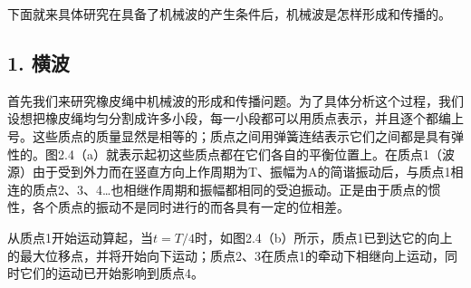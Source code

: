 下面就来具体研究在具备了机械波的产生条件后，机械波是怎样形成和传播的。

\subsection{1. 横波}\label{ux6a2aux6ce2}

首先我们来研究橡皮绳中机械波的形成和传播问题。为了具体分析这个过程，我们设想把橡皮绳均匀分割成许多小段，每一小段都可以用质点表示，并且逐个都编上号。这些质点的质量显然是相等的；质点之间用弹簧连结表示它们之间都是具有弹性的。图2.4（a）就表示起初这些质点都在它们各自的平衡位置上。在质点1（波源）由于受到外力而在竖直方向上作周期为T、振幅为A的简谐振动后，与质点1相连的质点2、3、4\ldots 也相继作周期和振幅都相同的受迫振动。正是由于质点的惯性，各个质点的振动不是同时进行的而各具有一定的位相差。

从质点1开始运动算起，当\(t = T / 4\)时，如图2.4（b）所示，质点1已到达它的向上的最大位移点，并将开始向下运动；质点2、3在质点1的牵动下相继向上运动，同时它们的运动已开始影响到质点4。

